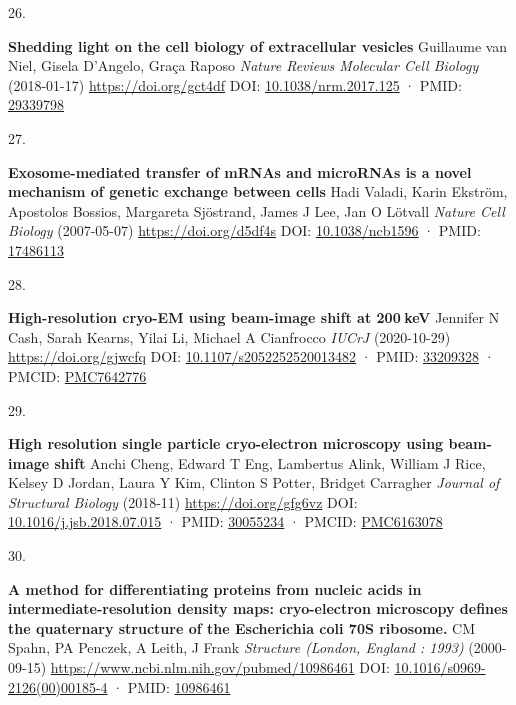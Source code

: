 \documentclass[
]{article}
\newlength{\cslhangindent}
\newlength{\csllabelwidth}
\newlength{\cslentryspacingunit} %
\newenvironment{CSLReferences}[2] %
 {%
  \setlength{\parindent}{0pt}
  \ifodd #1
  \let\oldpar\par
  \def\par{\hangindent=\cslhangindent\oldpar}
  \fi
  \setlength{\parskip}{#2\cslentryspacingunit}
 }%
 {}
\newcommand{\CSLBlock}[1]{#1\hfill\break}
\newcommand{\CSLLeftMargin}[1]{\parbox[t]{\csllabelwidth}{#1}}
\newcommand{\CSLRightInline}[1]{\parbox[t]{\linewidth - \csllabelwidth}{#1}\break}
\begin{document}
\begin{CSLReferences}{0}{0}
\leavevmode{}%
\CSLLeftMargin{26. }%
\CSLRightInline{\textbf{Shedding light on the cell biology of extracellular vesicles}
\CSLBlock{Guillaume van Niel, Gisela D'Angelo, Graça Raposo} \emph{Nature Reviews Molecular Cell Biology} (2018-01-17) \url{https://doi.org/gct4df}
\CSLBlock{DOI: \href{https://doi.org/10.1038/nrm.2017.125}{10.1038/nrm.2017.125} · PMID: \href{https://www.ncbi.nlm.nih.gov/pubmed/29339798}{29339798}}}

\leavevmode{}%
\CSLLeftMargin{27. }%
\CSLRightInline{\textbf{Exosome-mediated transfer of mRNAs and microRNAs is a novel mechanism of genetic exchange between cells}
\CSLBlock{Hadi Valadi, Karin Ekström, Apostolos Bossios, Margareta Sjöstrand, James J Lee, Jan O Lötvall} \emph{Nature Cell Biology} (2007-05-07) \url{https://doi.org/d5df4s}
\CSLBlock{DOI: \href{https://doi.org/10.1038/ncb1596}{10.1038/ncb1596} · PMID: \href{https://www.ncbi.nlm.nih.gov/pubmed/17486113}{17486113}}}

\leavevmode{}%
\CSLLeftMargin{28. }%
\CSLRightInline{\textbf{High-resolution cryo-EM using beam-image shift at 200 keV}
\CSLBlock{Jennifer N Cash, Sarah Kearns, Yilai Li, Michael A Cianfrocco} \emph{IUCrJ} (2020-10-29) \url{https://doi.org/gjwcfq}
\CSLBlock{DOI: \href{https://doi.org/10.1107/s2052252520013482}{10.1107/s2052252520013482} · PMID: \href{https://www.ncbi.nlm.nih.gov/pubmed/33209328}{33209328} · PMCID: \href{https://www.ncbi.nlm.nih.gov/pmc/articles/PMC7642776}{PMC7642776}}}

\leavevmode{}%
\CSLLeftMargin{29. }%
\CSLRightInline{\textbf{High resolution single particle cryo-electron microscopy using beam-image shift}
\CSLBlock{Anchi Cheng, Edward T Eng, Lambertus Alink, William J Rice, Kelsey D Jordan, Laura Y Kim, Clinton S Potter, Bridget Carragher} \emph{Journal of Structural Biology} (2018-11) \url{https://doi.org/gfg6vz}
\CSLBlock{DOI: \href{https://doi.org/10.1016/j.jsb.2018.07.015}{10.1016/j.jsb.2018.07.015} · PMID: \href{https://www.ncbi.nlm.nih.gov/pubmed/30055234}{30055234} · PMCID: \href{https://www.ncbi.nlm.nih.gov/pmc/articles/PMC6163078}{PMC6163078}}}

\leavevmode{}%
\CSLLeftMargin{30. }%
\CSLRightInline{\textbf{A method for differentiating proteins from nucleic acids in intermediate-resolution density maps: cryo-electron microscopy defines the quaternary structure of the Escherichia coli 70S ribosome.}
\CSLBlock{CM Spahn, PA Penczek, A Leith, J Frank} \emph{Structure (London, England : 1993)} (2000-09-15) \url{https://www.ncbi.nlm.nih.gov/pubmed/10986461}
\CSLBlock{DOI: \href{https://doi.org/10.1016/s0969-2126(00)00185-4}{10.1016/s0969-2126(00)00185-4} · PMID: \href{https://www.ncbi.nlm.nih.gov/pubmed/10986461}{10986461}}}


\end{CSLReferences}
\end{document}
